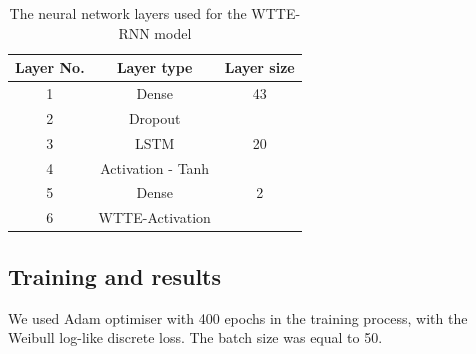 \begin{table}[h]
\begin{center}
\begin{tabular}{ |c|c|c| }
\hline
Layer No. & Layer type & Layer size\\
\hline
1 & Dense & 43\\
2 & Dropout & \\
3 & LSTM & 20\\
4 & Activation - Tanh & \\
5 & Dense & 2\\
6 & WTTE-Activation & \\
\hline
\end{tabular}
\caption{\label{tab:network}The neural network layers used for the WTTE-RNN model}
\end{center}
\end{table}


\subsection{Training and results}

We used Adam optimiser with 400 epochs in the training process, with the Weibull log-like discrete loss. The batch size was equal to 50.


